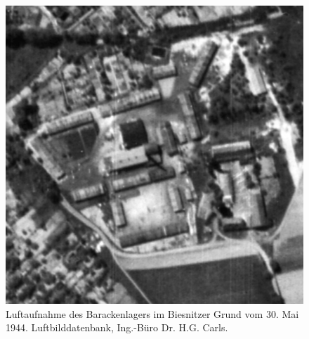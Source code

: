 \begin{flushleft}
    \setlength{\fboxsep}{0pt}
\begin{figure}
		\includegraphics[width=.99\linewidth]{images/lager0.jpg}
	\caption[Luftaufnahme des Lagers, 30. Mai 1945]{Luftaufnahme des Barackenlagers im Biesnitzer Grund vom 30. Mai 1944. Luftbilddatenbank, Ing.-Büro Dr. H.G. Carls.}
\end{figure}
\end{flushleft}





